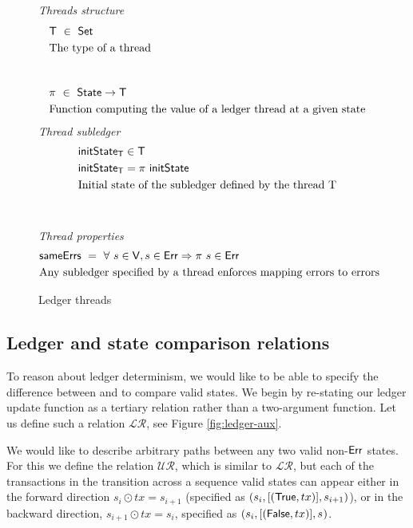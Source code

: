 \begin{figure*}[htb]
  \emph{Threads structure}
  \begin{align*}
    & \T ~\in~ \Set \\
    & \text{The type of a thread} \\
    \nextdef
    & \pi ~\in~ \State \to \T \\
    & \text{Function computing the value of a ledger thread at a given state} \\
  \end{align*}
  \emph{Thread subledger}
  \begin{align*}
    & \fun{initState}_{\T} \in \T \\
    & \fun{initState}_{\T} = \pi ~\fun{initState} \\
    & \text{Initial state of the subledger defined by the thread T} \\
    \nextdef
  \end{align*}
  \emph{Thread properties}
  \begin{align*}
    & \mathsf{sameErrs} ~=~ \forall~s \in \mathsf{V}, s \in \mathsf{Err} \Rightarrow \pi~s \in \mathsf{Err} \\
    & \text{Any subledger specified by a thread enforces mapping errors to errors} \\
  \end{align*}
  \caption{Ledger threads}
  \label{fig:ledger-thread}
\end{figure*}

\subsection{Ledger and state comparison relations}
\label{sec:relations}

To reason about ledger determinism, we would like to be able to specify the difference between
and to compare valid states. We begin by re-stating our ledger update function as
a tertiary relation rather than a two-argument function. Let us define
such a relation $\mathcal{LR}$, see Figure \ref{fig:ledger-aux}.

We would like to describe arbitrary paths between any two valid non-$\mathsf{Err}$ states.
For this we define the relation $\mathcal{UR}$, which is similar to $\mathcal{LR}$, but each
of the transactions in the transition across a sequence valid states can appear
either in the forward direction $s_i \odot tx = s_{i+1}$ (specified as $(s_i, [(\mathsf{True}, tx)], s_{i+1})$),
or in the backward direction, $s_{i+1} \odot tx = s_{i}$, specified as $(s_i, [(\mathsf{False}, tx)], s_{})$.

